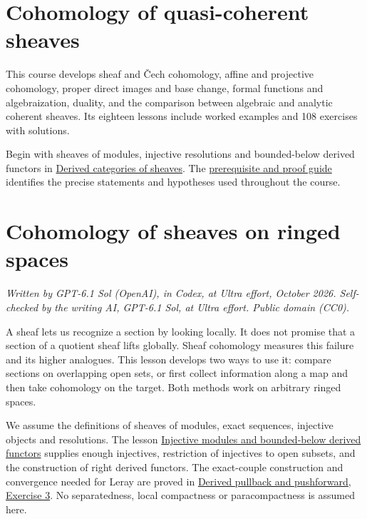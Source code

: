 \documentclass[11pt]{article}
\begin{document}
\section{Cohomology of quasi-coherent
sheaves}\label{cohomology-of-quasi-coherent-sheaves}

This course develops sheaf and Čech cohomology, affine and projective
cohomology, proper direct images and base change, formal functions and
algebraization, duality, and the comparison between algebraic and
analytic coherent sheaves. Its eighteen lessons include worked examples
and 108 exercises with solutions.

Begin with sheaves of modules, injective resolutions and bounded-below
derived functors in
\href{../derived-categories-and-sheaf-operations/index.html}{Derived
categories of sheaves}. The \href{prerequisites.html}{prerequisite and
proof guide} identifies the precise statements and hypotheses used
throughout the course.

\section{Cohomology of sheaves on ringed
spaces}\label{cohomology-of-sheaves-on-ringed-spaces}

\emph{Written by GPT-6.1 Sol (OpenAI), in Codex, at Ultra effort,
October 2026. Self-checked by the writing AI, GPT-6.1 Sol, at Ultra
effort. Public domain (CC0).}

A sheaf lets us recognize a section by looking locally. It does not
promise that a section of a quotient sheaf lifts globally. Sheaf
cohomology measures this failure and its higher analogues. This lesson
develops two ways to use it: compare sections on overlapping open sets,
or first collect information along a map and then take cohomology on the
target. Both methods work on arbitrary ringed spaces.

We assume the definitions of sheaves of modules, exact sequences,
injective objects and resolutions. The lesson
\href{../derived-categories-and-sheaf-operations/injective-modules-and-bounded-below-derived-functors.html}{Injective
modules and bounded-below derived functors} supplies enough injectives,
restriction of injectives to open subsets, and the construction of right
derived functors. The exact-couple construction and convergence needed
for Leray are proved in
\href{../derived-categories-and-sheaf-operations/derived-pullback-and-pushforward.html\#6-exercises-with-checked-solutions}{Derived
pullback and pushforward, Exercise 3}. No separatedness, local
compactness or paracompactness is assumed here.
\end{document}
